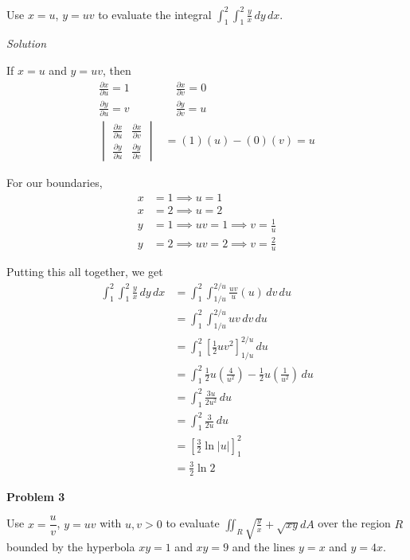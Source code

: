 \documentclass{article}
\newcommand{\lrp}[1]{\left( #1 \right)}
\newcommand{\lrb}[1]{\left[ #1 \right]}
\newcommand{\Solution}{\textit{Solution}}
\begin{document}
Use $x=u$, $y=uv$ to evaluate the integral $\displaystyle \int_1^2\int_1^2 \frac{y}{x}\,dy\,dx$.

\Solution

If $x=u$ and $y=uv$, then
\begin{align*}
    \frac{\partial x}{\partial u}=1&\hspace{1em}\frac{\partial x}{\partial v}=0\\
    \frac{\partial y}{\partial u}=v&\hspace{1em}\frac{\partial y}{\partial v}=u\\
    \begin{vmatrix}
    \frac{\partial x}{\partial u} & \frac{\partial x}{\partial v}\\
    \frac{\partial y}{\partial u} & 
    \frac{\partial y}{\partial v}
    \end{vmatrix}&= (1)(u)-(0)(v)= u
\end{align*}

For our boundaries,
\begin{align*}
    x&=1\implies u=1\tag{$x=u$}\\
    x&=2\implies u = 2\tag{$x=u$}\\
    y&=1\implies uv= 1\implies v= \frac{1}{u}\tag{$y=uv$}\\
    y&=2\implies uv= 2\implies v= \frac{2}{u}\tag{$y=uv$}
\end{align*}

Putting this all together, we get
\begin{align*}
    \int_1^2\int_1^2 \frac{y}{x}\,dy\,dx &= \int_1^2\int_{1/u}^{2/u}\frac{uv}{u}(u)\,dv\,du\\
    &=\int_1^2\int_{1/u}^{2/u} uv\,dv\,du\\
    &=\int_1^2\lrb{\frac{1}{2}uv^2}_{1/u}^{2/u}\,du\\
    &=\int_1^2 \frac{1}{2}u\lrp{\frac{4}{u^2}}-\frac{1}{2}u\lrp{\frac{1}{u^2}}\,du\\
    &=\int_1^2 \frac{3u}{2u^2}\,du\\
    &=\int_1^2 \frac{3}{2u}\,du\\
    &=\lrb{\frac{3}{2}\ln\left|u\right|}_1^2\\
    &=\boxed{\frac{3}{2}\ln 2}
\end{align*}
{}\textbf{Problem 3}

Use $x=\dfrac{u}{v}$, $y=uv$ with $u,v>0$ to evaluate $\displaystyle \iint_R \sqrt{\frac{y}{x}}+\sqrt{xy}dA$ over the region $R$ bounded by the hyperbola $xy=1$ and $xy=9$ and the lines $y=x$ and $y=4x$.
\end{document}
